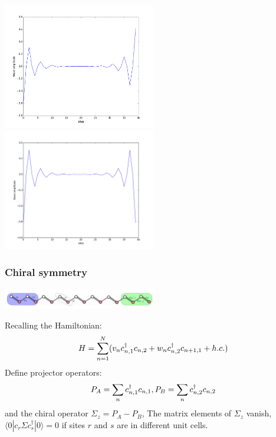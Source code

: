 \documentclass[letterpaper,10pt,english]{sphinxmanual}
\begin{document}
\includegraphics[width=0.5\textwidth]{c1.png} \includegraphics[width=0.5\textwidth]{c2.png}


\subsubsection{Chiral symmetry}
\label{TI/Lecture notes/1:chiral-symmetry}

\includegraphics[width=0.5\textwidth]{2.jpg}

Recalling the Hamiltonian:
\begin{gather}
\begin{split}H=\sum_{n=1}^N(v_n c_{n,1}^\dagger c_{n,2}+w_nc_{n,2}^\dagger c_{n+1,1}+h.c.)\end{split}\notag
\end{gather}
Define projector operators:
\begin{gather}
\begin{split}P_A=\sum_n c_{n,1}^\dagger c_{n,1}, P_B=\sum_n c_{n,2}^\dagger c_{n,2}\end{split}\notag
\end{gather}
and the chiral operator \(\Sigma_z=P_A-P_B\), The matrix elements
of \(\Sigma_z\) vanish,
\(\langle 0|c_r \Sigma c^\dagger_s|0\rangle=0\) if sites \(r\)
and \(s\) are in different unit cells.
\end{document}
